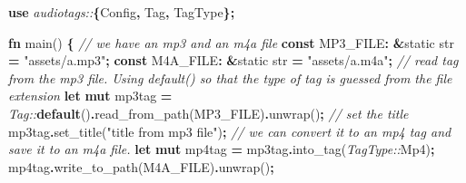 \documentclass[
]{book}
\newenvironment{Shaded}{\begin{snugshade}}{\end{snugshade}}
\newcommand{\CommentTok}[1]{\textcolor[rgb]{0.56,0.35,0.01}{\textit{#1}}}
\newcommand{\DataTypeTok}[1]{\textcolor[rgb]{0.13,0.29,0.53}{#1}}
\newcommand{\KeywordTok}[1]{\textcolor[rgb]{0.13,0.29,0.53}{\textbf{#1}}}
\newcommand{\NormalTok}[1]{#1}
\newcommand{\OperatorTok}[1]{\textcolor[rgb]{0.81,0.36,0.00}{\textbf{#1}}}
\newcommand{\OtherTok}[1]{\textcolor[rgb]{0.56,0.35,0.01}{#1}}
\newcommand{\PreprocessorTok}[1]{\textcolor[rgb]{0.56,0.35,0.01}{\textit{#1}}}
\newcommand{\StringTok}[1]{\textcolor[rgb]{0.31,0.60,0.02}{#1}}
\begin{document}
\begin{Shaded}
\begin{Highlighting}[]
\KeywordTok{use} \PreprocessorTok{audiotags::}\OperatorTok{\{}\NormalTok{Config}\OperatorTok{,}\NormalTok{ Tag}\OperatorTok{,}\NormalTok{ TagType}\OperatorTok{\};}

\KeywordTok{fn}\NormalTok{ main() }\OperatorTok{\{}
    \CommentTok{// we have an mp3 and an m4a file}
    \KeywordTok{const}\NormalTok{ MP3\_FILE}\OperatorTok{:} \OperatorTok{\&}\OtherTok{\textquotesingle{}static} \DataTypeTok{str} \OperatorTok{=} \StringTok{"assets/a.mp3"}\OperatorTok{;}
    \KeywordTok{const}\NormalTok{ M4A\_FILE}\OperatorTok{:} \OperatorTok{\&}\OtherTok{\textquotesingle{}static} \DataTypeTok{str} \OperatorTok{=} \StringTok{"assets/a.m4a"}\OperatorTok{;}
    \CommentTok{// read tag from the mp3 file. Using \textasciigrave{}default()\textasciigrave{} so that the type of tag is guessed from the file extension}
    \KeywordTok{let} \KeywordTok{mut}\NormalTok{ mp3tag }\OperatorTok{=} \PreprocessorTok{Tag::}\KeywordTok{default}\NormalTok{()}\OperatorTok{.}\NormalTok{read\_from\_path(MP3\_FILE)}\OperatorTok{.}\NormalTok{unwrap()}\OperatorTok{;}
    \CommentTok{// set the title}
\NormalTok{    mp3tag}\OperatorTok{.}\NormalTok{set\_title(}\StringTok{"title from mp3 file"}\NormalTok{)}\OperatorTok{;}
    \CommentTok{// we can convert it to an mp4 tag and save it to an m4a file.}
    \KeywordTok{let} \KeywordTok{mut}\NormalTok{ mp4tag }\OperatorTok{=}\NormalTok{ mp3tag}\OperatorTok{.}\NormalTok{into\_tag(}\PreprocessorTok{TagType::}\NormalTok{Mp4)}\OperatorTok{;}
\NormalTok{    mp4tag}\OperatorTok{.}\NormalTok{write\_to\_path(M4A\_FILE)}\OperatorTok{.}\NormalTok{unwrap()}\OperatorTok{;}


\end{Highlighting}
\end{Shaded}
\end{document}
